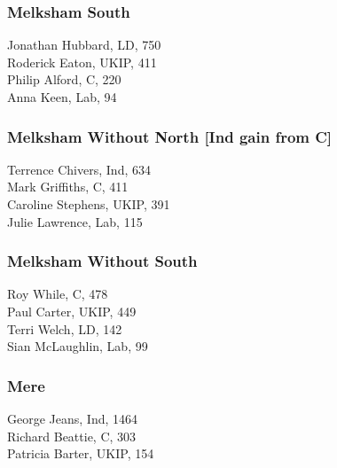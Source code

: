 \documentclass[a4paper,openany,10pt]{book}
\begin{document}
\subsubsection*{Melksham South}



Jonathan Hubbard, LD, 750\\
Roderick Eaton, UKIP, 411\\
Philip Alford, C, 220\\
Anna Keen, Lab, 94\\


\subsubsection*{Melksham Without North \hspace*{\fill}\nolinebreak[1]%
\enspace\hspace*{\fill}
[Ind gain from C]}



Terrence Chivers, Ind, 634\\
Mark Griffiths, C, 411\\
Caroline Stephens, UKIP, 391\\
Julie Lawrence, Lab, 115\\


\subsubsection*{Melksham Without South}



Roy While, C, 478\\
Paul Carter, UKIP, 449\\
Terri Welch, LD, 142\\
Sian McLaughlin, Lab, 99\\


\subsubsection*{Mere}



George Jeans, Ind, 1464\\
Richard Beattie, C, 303\\
Patricia Barter, UKIP, 154\\
\end{document}
